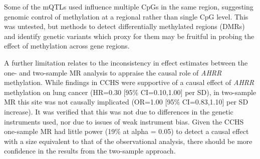 \documentclass[11pt,twoside]{bristolthesis}
\begin{document}
Some of the mQTLs used influence multiple CpGs in the same region, suggesting genomic control of methylation at a regional rather than single CpG level. This was untested, but methods to detect differentially methylated regions (DMRs) and identify genetic variants which proxy for them may be fruitful in probing the effect of methylation across gene regions.

A further limitation relates to the inconsistency in effect estimates between the one- and two-sample MR analysis to appraise the causal role of \emph{AHRR} methylation. While findings in CCHS were supportive of a causal effect of \emph{AHRR} methylation on lung cancer (HR=0.30 {[}95\% CI=0.10,1.00{]} per SD), in two-sample MR this site was not causally implicated (OR=1.00 {[}95\% CI=0.83,1.10{]} per SD increase). It was verified that this was not due to differences in the genetic instruments used, nor due to issues of weak instrument bias. Given the CCHS one-sample MR had little power (19\% at alpha = 0.05) to detect a causal effect with a size equivalent to that of the observational analysis, there should be more confidence in the results from the two-sample approach.
\end{document}
